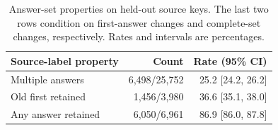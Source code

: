 \begin{table}[t]
\centering
\footnotesize
\setlength{\tabcolsep}{3pt}
\begin{tabular}{lrr}
\toprule
Source-label property & Count & Rate (95\% CI) \\
\midrule
Multiple answers & 6,498/25,752 & 25.2 [24.2, 26.2] \\
Old first retained & 1,456/3,980 & 36.6 [35.1, 38.0] \\
Any answer retained & 6,050/6,961 & 86.9 [86.0, 87.8] \\
\bottomrule
\end{tabular}
\caption{Answer-set properties on held-out source keys. The last two rows condition on first-answer changes and complete-set changes, respectively. Rates and intervals are percentages.}
\label{tab:sourceaudit}
\end{table}

